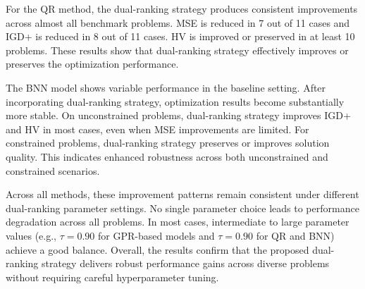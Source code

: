 \documentclass{article}
\begin{document}
For the QR method, the dual-ranking strategy produces consistent improvements across almost all benchmark problems. MSE is reduced in 7 out of 11 cases and IGD+ is reduced in 8 out of 11 cases. HV is improved or preserved in at least 10 problems. These results show that dual-ranking strategy effectively improves or preserves the optimization performance.

The BNN model shows variable performance in the baseline setting. After incorporating dual-ranking strategy, optimization results become substantially more stable. On unconstrained problems, dual-ranking strategy improves IGD+ and HV in most cases, even when MSE improvements are limited. For constrained problems, dual-ranking strategy preserves or improves solution quality. This indicates enhanced robustness across both unconstrained and constrained scenarios.

Across all methods, these improvement patterns remain consistent under different dual-ranking parameter settings. No single parameter choice leads to performance degradation across all problems. In most cases, intermediate to large parameter values (e.g., $\tau=0.90$ for GPR-based models and $\tau=0.90$ for QR and BNN) achieve a good balance. Overall, the results confirm that the proposed dual-ranking strategy delivers robust performance gains across diverse problems without requiring careful hyperparameter tuning.
\end{document}
